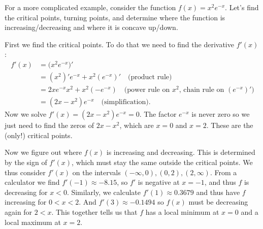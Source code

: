 \begin{bsp}

For a more complicated example, consider the function $f(x) = x^2e^{-x}$.
Let's find the critical points, turning points, and determine where the function is increasing/decreasing and where it is concave up/down. 

First we find the critical points. To do that we need to find the derivative $f'(x)$:
\begin{equation*}
\begin{split}
f'(x) &= \big(x^2e^{-x}\big)' \\
&= (x^2)'e^{-x} + x^2(e^{-x})' \quad \text{(product rule)} \\
&= 2xe^{-x}x^2 + x^2(-e^{-x}) \quad \text{(power rule on }x^2 \text{, chain rule on }(e^{-x})' \text{)} \\
&= (2x-x^2)e^{-x} \quad \text{(simplification)}.
\end{split}
\end{equation*} 
Now we solve $f'(x) = (2x-x^2)e^{-x} = 0$. The factor $e^{-x}$ is never zero
so we just need to find the zeros of $2x-x^2$, which are $x=0$ and $x=2$.
These are the (only!) critical points.

Now we figure out where $f(x)$ is increasing and decreasing. This is
determined by the sign of $f'(x)$, which must stay the same outside the
critical points. We thus consider $f'(x)$  on the intervals $(-\infty,0), (0,2), (2,\infty)$.
From
a calculator we find $f'(-1) \approx -8.15$, so $f'$ is negative at $x=-1$,
and thus $f$ is decreasing for $x<0$.
Similarly, we calculate $f'(1) \approx 0.3679$ and thus have $f$ increasing
for $0<x<2$. And
$f'(3) \approx -0.1494$ so $f(x)$
must be decreasing again for $2<x$. This together tells us that $f$ has a
local minimum at $x=0$ and a
local maximum at $x=2$.


\end{bsp}
